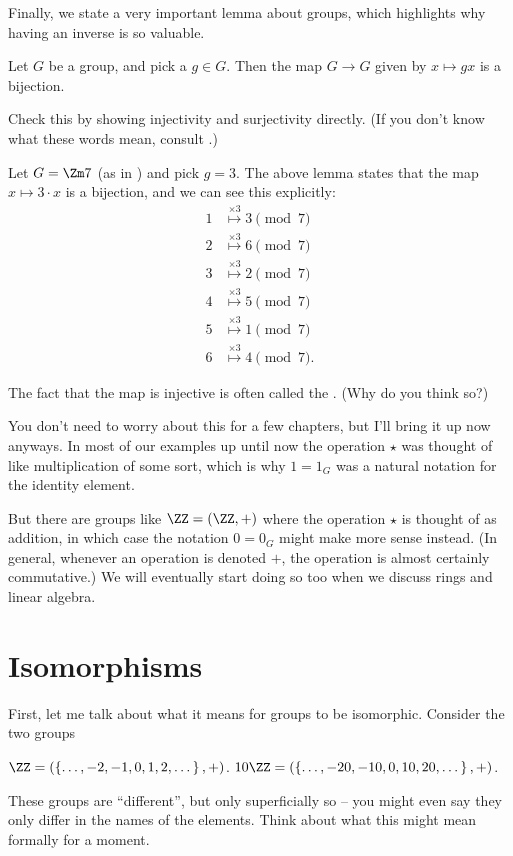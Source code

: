 Finally, we state a very important lemma about groups,
which highlights why having an inverse is so valuable.
\begin{lemma}
	Let $G$ be a group, and pick a $g \in G$.
	Then the map $G \to G$ given by $x \mapsto gx$ is a bijection.
	\label{lem:group_mult_biject}
\end{lemma}
\begin{exercise}
	Check this by showing injectivity and surjectivity directly.
	(If you don't know what these words mean,
	consult .)
\end{exercise}
\begin{example}
	Let $G = \Zm 7$ (as in ) and pick $g=3$.
	The above lemma states that the map $x \mapsto 3 \cdot x$ is a bijection, and we can see this explicitly:
	\begin{align*}
		1 &\overset{\times 3}{\longmapsto} 3 \pmod 7 \\
		2 &\overset{\times 3}{\longmapsto} 6 \pmod 7 \\
		3 &\overset{\times 3}{\longmapsto} 2 \pmod 7 \\
		4 &\overset{\times 3}{\longmapsto} 5 \pmod 7 \\
		5 &\overset{\times 3}{\longmapsto} 1 \pmod 7 \\
		6 &\overset{\times 3}{\longmapsto} 4 \pmod 7.
	\end{align*}
\end{example}
The fact that the map is injective is often called the .
(Why do you think so?)

\begin{abuse}
	You don't need to worry about this for a few chapters,
	but I'll bring it up now anyways.
	In most of our examples up until now the operation $\star$
	was thought of like multiplication of some sort,
	which is why $1 = 1_G$ was a natural notation for the identity element.

	But there are groups like $\ZZ = (\ZZ,+)$
	where the operation $\star$ is thought of as addition,
	in which case the notation $0 = 0_G$ might make more sense instead.
	(In general, whenever an operation is denoted $+$,
	the operation is almost certainly commutative.)
	We will eventually start doing so too
	when we discuss rings and linear algebra.
\end{abuse}

\section{Isomorphisms}
First, let me talk about what it means for groups to be isomorphic.
Consider the two groups
\begin{itemize}
	\ii $\ZZ = (\left\{ \dots,-2,-1,0,1,2,\dots \right\}, +)$.
	\ii $10\ZZ = (\left\{ \dots, -20, -10, 0, 10, 20, \dots \right\}, +)$.
\end{itemize}
These groups are ``different'', but only superficially so -- you might even say they only differ in the names of the elements.
Think about what this might mean formally for a moment.

